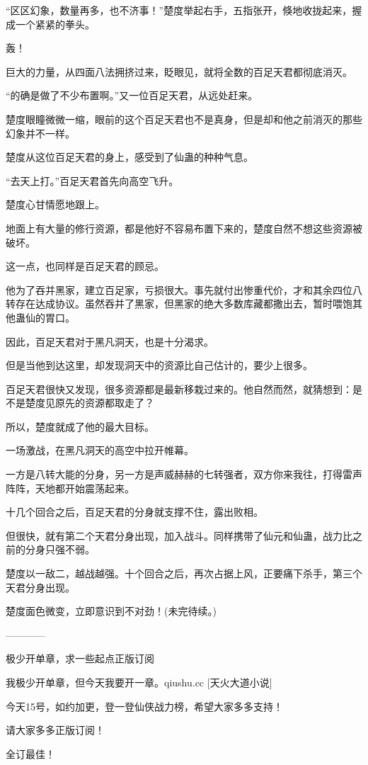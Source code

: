 \begin{this_body}
“区区幻象，数量再多，也不济事！”楚度举起右手，五指张开，倏地收拢起来，握成一个紧紧的拳头。

轰！

巨大的力量，从四面八法拥挤过来，眨眼见，就将全数的百足天君都彻底消灭。

“的确是做了不少布置啊。”又一位百足天君，从远处赶来。

楚度眼瞳微微一缩，眼前的这个百足天君也不是真身，但是却和他之前消灭的那些幻象并不一样。

楚度从这位百足天君的身上，感受到了仙蛊的种种气息。

“去天上打。”百足天君首先向高空飞升。

楚度心甘情愿地跟上。

地面上有大量的修行资源，都是他好不容易布置下来的，楚度自然不想这些资源被破坏。

这一点，也同样是百足天君的顾忌。

他为了吞并黑家，建立百足家，亏损很大。事先就付出惨重代价，才和其余四位八转存在达成协议。虽然吞并了黑家，但黑家的绝大多数库藏都撒出去，暂时喂饱其他蛊仙的胃口。

因此，百足天君对于黑凡洞天，也是十分渴求。

但是当他到达这里，却发现洞天中的资源比自己估计的，要少上很多。

百足天君很快又发现，很多资源都是最新移栽过来的。他自然而然，就猜想到：是不是楚度见原先的资源都取走了？

所以，楚度就成了他的最大目标。

一场激战，在黑凡洞天的高空中拉开帷幕。

一方是八转大能的分身，另一方是声威赫赫的七转强者，双方你来我往，打得雷声阵阵，天地都开始震荡起来。

十几个回合之后，百足天君的分身就支撑不住，露出败相。

但很快，就有第二个天君分身出现，加入战斗。同样携带了仙元和仙蛊，战力比之前的分身只强不弱。

楚度以一敌二，越战越强。十个回合之后，再次占据上风，正要痛下杀手，第三个天君分身出现。

楚度面色微变，立即意识到不对劲！(未完待续。)

------------

极少开单章，求一些起点正版订阅

我极少开单章，但今天我要开一章。qiushu.cc [天火大道小说]

今天15号，如约加更，登一登仙侠战力榜，希望大家多多支持！

请大家多多正版订阅！

全订最佳！


\end{this_body}

